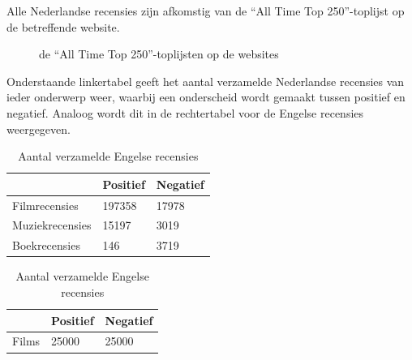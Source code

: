 Alle Nederlandse recensies zijn afkomstig van de ``All Time Top 250''-toplijst op de betreffende website.

\begin{figure}%
    \centering
    \caption{de ``All Time Top 250''-toplijsten op de websites}%
\end{figure}

Onderstaande linkertabel geeft het aantal verzamelde Nederlandse recensies van ieder onderwerp weer, waarbij een onderscheid wordt gemaakt tussen positief en negatief. Analoog wordt dit in de rechtertabel voor de Engelse recensies weergegeven.\\

\begin{table}[H]
\centering
\setlength\tabcolsep{2pt}
\begin{minipage}[t]{0.48\textwidth}
\centering
\begin{tabular}{l|l|l|}
\cline{2-3}
                                      & Positief & Negatief \\ \hline
\multicolumn{1}{|l|}{Filmrecensies}   & 197358   & 17978    \\ \hline
\multicolumn{1}{|l|}{Muziekrecensies} & 15197    & 3019     \\ \hline
\multicolumn{1}{|l|}{Boekrecensies}   & 146      & 3719     \\ \hline
\end{tabular}
\caption{Aantal verzamelde Nederlandse recensies} 
\label{tabel: aantal verzamelde Nederlandse recensies}
\end{minipage}%
\hfill
\begin{minipage}[t]{0.48\textwidth}
\centering
\begin{tabular}{l|l|l|}
\cline{2-3}
                            & Positief & Negatief \\ \hline
\multicolumn{1}{|l|}{Films} & 25000   & 25000    \\ \hline
\end{tabular}
\caption{Aantal verzamelde Engelse recensies}
\end{minipage}
\end{table}

